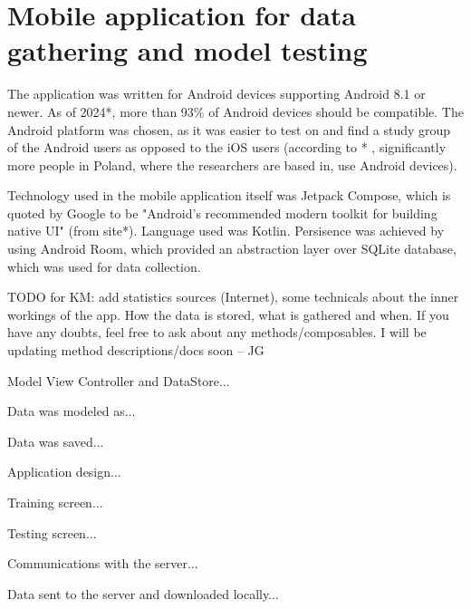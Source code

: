 
\chapter{Mobile application for data gathering and model testing}

The application was written for Android devices supporting Android 8.1 or newer. As of 2024*, more than 93\% of Android devices should be compatible. The Android platform was chosen, as it was easier to test on and find a study group of the Android users as opposed to the iOS users (according to * , significantly more people in Poland, where the researchers are based in, use Android devices).

Technology used in the mobile application itself was Jetpack Compose, which is quoted by Google to be "Android’s recommended modern toolkit for building native UI" (from site*). Language used was Kotlin. Persisence was achieved by using Android Room, which provided an abstraction layer over SQLite database, which was used for data collection.

TODO for KM: add statistics sources (Internet), some technicals about the inner workings of the app. How the data is stored, what is gathered and when. If you have any doubts, feel free to ask about any methods/composables. I will be updating method descriptions/docs soon -- JG

Model View Controller and DataStore...

Data was modeled as...

Data was saved...

Application design...

Training screen...

Testing screen...

Communications with the server...

Data sent to the server and downloaded locally...

